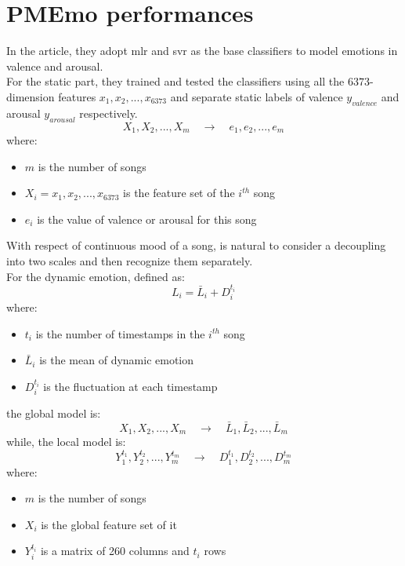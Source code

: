 \section{PMEmo performances}
In the article, they adopt \gls{mlr} and \gls{svr} as the base classifiers to model emotions in valence and arousal.
\\
For the static part, they trained and tested the classifiers using all the $6373$-dimension features $x_1,x_2,...,x_{6373}$ and separate static labels of valence $y_{valence}$ and arousal $y_{arousal}$ respectively.
\begin{equation}
	{X_1,X_2,...,X_m} \quad \rightarrow \quad {e_1,e_2,...,e_m}
\end{equation}
where:
\begin{itemize}
	\item $m$ is the number of songs
	\item $X_i={x_1,x_2,...,x_{6373}}$ is the feature set of the $i^{th}$ song
	\item $e_i$ is the value of valence or arousal for this song
\end{itemize}
With respect of continuous mood of a song, is natural to consider a decoupling into two scales and then recognize them separately.
\\
For the dynamic emotion, defined as:
\begin{equation}
	L_i=\bar{L}_i+D_i^{t_i}
\end{equation}
where:
\begin{itemize}
	\item $t_i$ is the number of timestamps in the $i^{th}$ song
	\item $\bar{L}_i$ is the mean of dynamic emotion
	\item $D_i^{t_i}$ is the fluctuation at each timestamp
\end{itemize}
the global model is:
\begin{equation}
	{X_1,X_2,...,X_m} \quad \rightarrow \quad {\bar{L}_1,\bar{L}_2,...,\bar{L}_m}
\end{equation}
while, the local model is:
\begin{equation}
	{Y_1^{t_1},Y_2^{t_2},...,Y_m^{t_m}} \quad \rightarrow \quad {D_1^{t_1},D_2^{t_2},...,D_m^{t_m}}
\end{equation}
where:
\begin{itemize}
	\item $m$ is the number of songs
	\item $X_i$ is the global feature set of it
	\item $Y_i^{t_i}$ is a matrix of 260 columns and $t_i$ rows
\end{itemize}
